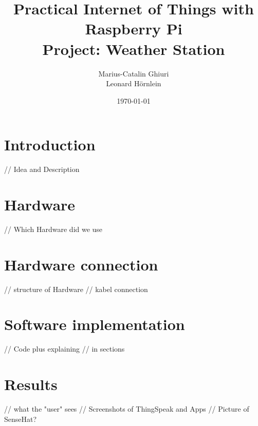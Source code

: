 \documentclass[titlepage]{article}
\title{Practical Internet of Things with Raspberry Pi\\ Project: Weather Station}
\author{Marius-Catalin Ghiuri\\Leonard Hörnlein}
\date{\today}
\begin{document}
\maketitle
\newpage
\tableofcontents
\newpage

\section{Introduction}
// Idea and Description

\section{Hardware}
// Which Hardware did we use

\section{Hardware connection}
// structure of Hardware
// kabel connection

\section{Software implementation}
// Code plus explaining
// in sections

\section{Results}
// what the "user" sees
// Screenshots of ThingSpeak and Apps
// Picture of SenseHat?
\end{document}
